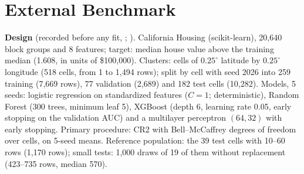 \documentclass[11pt,a4paper]{article}
\begin{document}
\section{External Benchmark}
\label{app:external}

\textbf{Design} (recorded before any fit, ; ). California Housing (scikit-learn), 20{,}640 block groups and 8 features; target: median house value above the training median (1.608, in units of \$100{,}000). Clusters: cells of $0.25^\circ$ latitude by $0.25^\circ$ longitude (518 cells, from 1 to 1{,}494 rows); split by cell with seed 2026 into 259 training (7{,}669 rows), 77 validation (2{,}689) and 182 test cells (10{,}282). Models, 5 seeds: logistic regression on standardized features ($C=1$; deterministic), Random Forest (300 trees, minimum leaf 5), XGBoost (depth 6, learning rate 0.05, early stopping on the validation AUC) and a multilayer perceptron $(64,32)$ with early stopping. Primary procedure: CR2 with Bell--McCaffrey degrees of freedom over cells, on 5-seed means. Reference population: the 39 test cells with 10--60 rows (1{,}170 rows); small tests: 1{,}000 draws of 19 of them without replacement (423--735 rows, median 570).

\begin{table}[htbp]
\centering
\caption{External benchmark. Reference: the contrast on the 39 reference cells with its CR2 interval. Small tests (recorded design): share of the 1{,}000 draws of 19 of these cells in which the 95\,\% interval excludes zero (resolved) and in which it covers the reference difference. All test cells (post hoc): the contrast on the 182 test cells, and the coverage of that reference by small tests of 19 of the 182 cells, for which the finite-population factor is 0.95 instead of 0.72.}
\label{tab:external}
{\small
{}}
\end{table}
\end{document}
